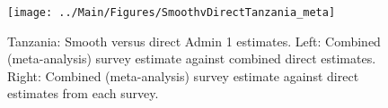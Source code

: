 \documentclass[12pt]{article}\usepackage[]{graphicx}\usepackage[]{color}
\newenvironment{knitrout}{}{} %
\begin{document}

\begin{knitrout}
\color{fgcolor}\begin{figure}[bht]

{\centering \texttt{[image: ../Main/Figures/SmoothvDirectTanzania\_meta]} 

}

\caption[Tanzania]{Tanzania: Smooth versus direct Admin 1 estimates. Left: Combined (meta-analysis) survey estimate against combined direct estimates. Right: Combined (meta-analysis) survey estimate against direct estimates from each survey.}\label{fig:unnamed-chunk-303}
\end{figure}


\end{knitrout}
\end{document}
